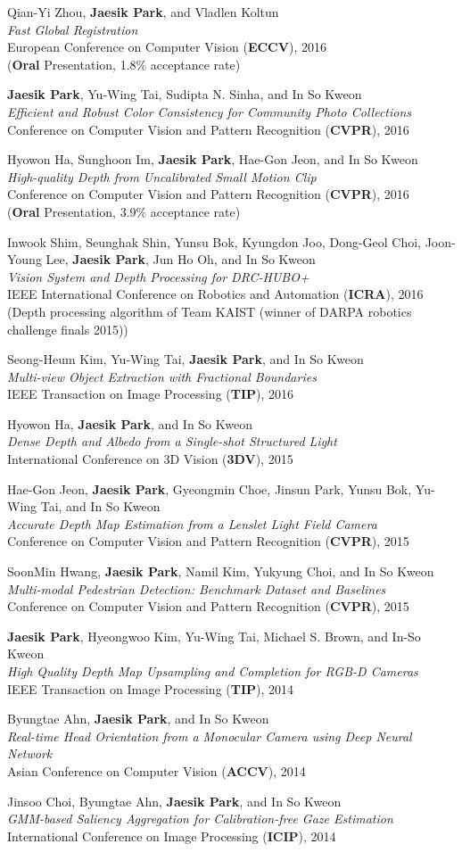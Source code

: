 \documentclass[letterpaper,11pt]{article}
\newcommand{\publicationItem}[4]{
  \small{
  \item{#1\\ \emph{#2}\\ #3\\ #4}
  }
}
\begin{document}
    \publicationItem{Qian-Yi Zhou, \textbf{Jaesik Park}, and Vladlen Koltun}{Fast Global Registration}{European Conference on Computer Vision (\textbf{ECCV}), 2016}{(\textbf{Oral} Presentation, 1.8\% acceptance rate)}
    \publicationItem{\textbf{Jaesik Park}, Yu-Wing Tai, Sudipta N. Sinha, and In So Kweon}{Efficient and Robust Color Consistency for Community Photo Collections}{Conference on Computer Vision and Pattern Recognition (\textbf{CVPR}), 2016}{}
    \publicationItem{Hyowon Ha, Sunghoon Im, \textbf{Jaesik Park}, Hae-Gon Jeon, and In So Kweon}{High-quality Depth from Uncalibrated Small Motion Clip}{Conference on Computer Vision and Pattern Recognition (\textbf{CVPR}), 2016}{(\textbf{Oral} Presentation, 3.9\% acceptance rate)}
    \publicationItem{Inwook Shim, Seunghak Shin, Yunsu Bok, Kyungdon Joo, Dong-Geol Choi, Joon-Young Lee, \textbf{Jaesik Park}, Jun Ho Oh, and In So Kweon}{Vision System and Depth Processing for DRC-HUBO+}{IEEE International Conference on Robotics and Automation (\textbf{ICRA}), 2016}{(Depth processing algorithm of Team KAIST (winner of DARPA robotics challenge finals 2015))}
    \publicationItem{Seong-Heum Kim, Yu-Wing Tai, \textbf{Jaesik Park}, and In So Kweon}{Multi-view Object Extraction with Fractional Boundaries}{IEEE Transaction on Image Processing (\textbf{TIP}), 2016}{}
    \publicationItem{Hyowon Ha, \textbf{Jaesik Park}, and In So Kweon}{Dense Depth and Albedo from a Single-shot Structured Light}{International Conference on 3D Vision (\textbf{3DV}), 2015}{}
    \publicationItem{Hae-Gon Jeon, \textbf{Jaesik Park}, Gyeongmin Choe, Jinsun Park, Yunsu Bok, Yu-Wing Tai, and In So Kweon}{Accurate Depth Map Estimation from a Lenslet Light Field Camera}{Conference on Computer Vision and Pattern Recognition (\textbf{CVPR}), 2015}{}
    \publicationItem{SoonMin Hwang, \textbf{Jaesik Park}, Namil Kim, Yukyung Choi, and In So Kweon}{Multi-modal Pedestrian Detection: Benchmark Dataset and Baselines}{Conference on Computer Vision and Pattern Recognition (\textbf{CVPR}), 2015}{}
    \publicationItem{\textbf{Jaesik Park}, Hyeongwoo Kim, Yu-Wing Tai, Michael S. Brown, and In-So Kweon}{High Quality Depth Map Upsampling and Completion for RGB-D Cameras}{IEEE Transaction on Image Processing (\textbf{TIP}), 2014}{}
    \publicationItem{Byungtae Ahn, \textbf{Jaesik Park}, and In So Kweon}{Real-time Head Orientation from a Monocular Camera using Deep Neural Network}{Asian Conference on Computer Vision (\textbf{ACCV}), 2014}{}
    \publicationItem{Jinsoo Choi, Byungtae Ahn, \textbf{Jaesik Park}, and In So Kweon}{GMM-based Saliency Aggregation for Calibration-free Gaze Estimation}{International Conference on Image Processing (\textbf{ICIP}), 2014}{}
\end{document}
